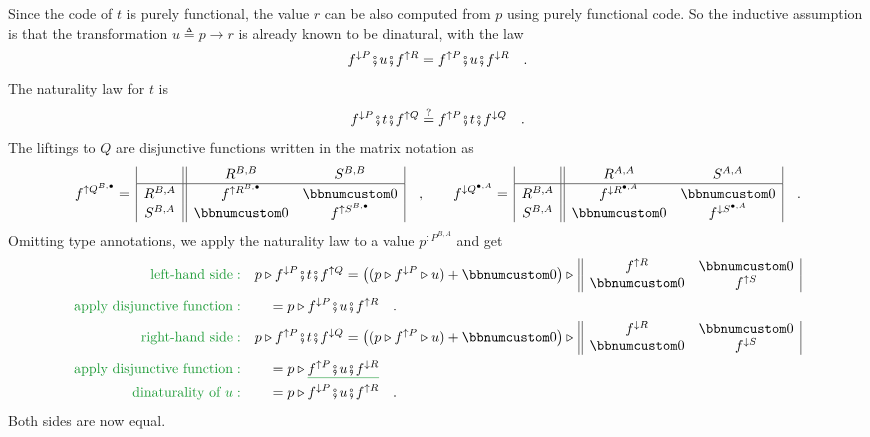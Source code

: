 Since the code of $t$ is purely functional, the value $r$ can be
also computed from $p$ using purely functional code. So the inductive
assumption is that the transformation $u\triangleq p\rightarrow r$
is already known to be dinatural, with the law
\[
f^{\downarrow P}\bef u\bef f^{\uparrow R}=f^{\uparrow P}\bef u\bef f^{\downarrow R}\quad.
\]
 The naturality law for $t$ is
\[
f^{\downarrow P}\bef t\bef f^{\uparrow Q}\overset{?}{=}f^{\uparrow P}\bef t\bef f^{\downarrow Q}\quad.
\]
The liftings to $Q$ are disjunctive functions written in the matrix
notation as
\[
f^{\uparrow Q^{B,\bullet}}=\,\begin{array}{|c||cc|}
 & R^{B,B} & S^{B,B}\\
\hline R^{B,A} & f^{\uparrow R^{B,\bullet}} & \bbnum 0\\
S^{B,A} & \bbnum 0 & f^{\uparrow S^{B,\bullet}}
\end{array}\quad,\quad\quad f^{\downarrow Q^{\bullet,A}}=\,\begin{array}{|c||cc|}
 & R^{A,A} & S^{A,A}\\
\hline R^{B,A} & f^{\downarrow R^{\bullet,A}} & \bbnum 0\\
S^{B,A} & \bbnum 0 & f^{\downarrow S^{\bullet,A}}
\end{array}\quad.
\]
Omitting type annotations, we apply the naturality law to a value
$p^{:P^{B,A}}$ and get
\begin{align*}
{\color{greenunder}\text{left-hand side}:}\quad & p\triangleright f^{\downarrow P}\bef t\bef f^{\uparrow Q}=\big((p\triangleright f^{\downarrow P}\triangleright u)+\bbnum 0\big)\triangleright\,\begin{array}{||cc|}
f^{\uparrow R} & \bbnum 0\\
\bbnum 0 & f^{\uparrow S}
\end{array}\\
{\color{greenunder}\text{apply disjunctive function}:}\quad & \quad=p\triangleright f^{\downarrow P}\bef u\bef f^{\uparrow R}\quad.\\
{\color{greenunder}\text{right-hand side}:}\quad & p\triangleright f^{\uparrow P}\bef t\bef f^{\downarrow Q}=\big((p\triangleright f^{\uparrow P}\triangleright u)+\bbnum 0\big)\triangleright\,\begin{array}{||cc|}
f^{\downarrow R} & \bbnum 0\\
\bbnum 0 & f^{\downarrow S}
\end{array}\\
{\color{greenunder}\text{apply disjunctive function}:}\quad & \quad=p\triangleright\gunderline{f^{\uparrow P}\bef u\bef f^{\downarrow R}}\\
{\color{greenunder}\text{dinaturality of }u:}\quad & \quad=p\triangleright f^{\downarrow P}\bef u\bef f^{\uparrow R}\quad.
\end{align*}
Both sides are now equal.

